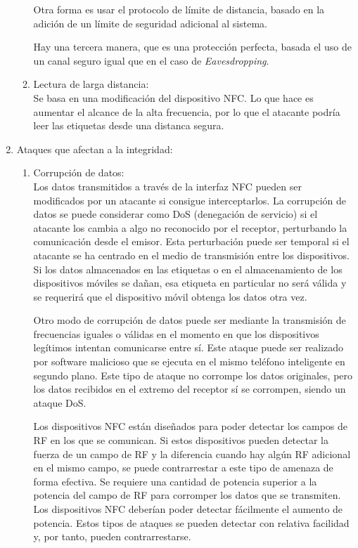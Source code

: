 \documentclass[12pt,a4paper,onecolumn,oneside]{report}
\begin{document}
\begin{enumerate}
\begin{enumerate}
Otra forma es usar el protocolo de límite de distancia, basado en la adición de un límite de seguridad adicional al sistema. 

Hay una tercera manera, que es una protección perfecta, basada el uso de un canal seguro igual que en el caso de \textit{Eavesdropping}.

\item Lectura de larga distancia:\\
Se basa en una modificación del dispositivo NFC. Lo que hace es aumentar el alcance de la alta frecuencia, por lo que el atacante podría leer las etiquetas desde una distanca segura.

\end{enumerate}

\item Ataques que afectan a la integridad:\\
\begin{enumerate}

\item Corrupción de datos:\\
Los datos transmitidos a través de la interfaz NFC pueden ser modificados por un atacante si consigue interceptarlos. La corrupción de datos se puede considerar como DoS (denegación de servicio) si el atacante los cambia a algo no reconocido por el receptor, perturbando la comunicación desde el emisor. Esta perturbación puede ser temporal si el atacante se ha centrado en el medio de transmisión entre los dispositivos. Si los datos almacenados en las etiquetas o en el almacenamiento de los dispositivos móviles se dañan, esa etiqueta en particular no será válida y se requerirá que el dispositivo móvil obtenga los datos otra vez.

Otro modo de corrupción de datos puede ser mediante la transmisión de frecuencias iguales o válidas en el momento en que los dispositivos legítimos intentan comunicarse entre sí. Este ataque puede ser realizado por software malicioso que se ejecuta en el mismo teléfono inteligente en segundo plano. Este tipo de ataque no corrompe los datos originales, pero los datos recibidos en el extremo del receptor sí se corrompen, siendo un ataque DoS. 

Los dispositivos NFC están diseñados para poder detectar los campos de RF en los que se comunican. Si estos dispositivos pueden detectar la fuerza de un campo de RF y la diferencia cuando hay algún RF adicional en el mismo campo, se puede contrarrestar a este tipo de amenaza de forma efectiva. Se requiere una cantidad de potencia superior a la potencia del campo de RF para corromper los datos que se transmiten. Los dispositivos NFC deberían poder detectar fácilmente el aumento de potencia. Estos tipos de ataques se pueden detectar con relativa facilidad y, por tanto, pueden contrarrestarse.


\end{enumerate}
\end{enumerate}
\end{document}
